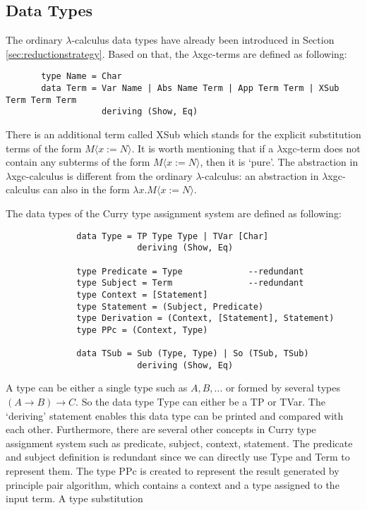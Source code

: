 \subsection{Data Types}

The ordinary $\lambda$-calculus data types have already been introduced in Section \ref{sec:reductionstrategy}. Based on that, the $\lambda$xgc-terms are defined as following: 
\begin{verbatim}
       type Name = Char  
       data Term = Var Name | Abs Name Term | App Term Term | XSub Term Term Term
                   deriving (Show, Eq)
\end{verbatim}
There is an additional term called \textsf{XSub} which stands for the explicit substitution terms of the form $M\langle x := N\rangle$. It is worth mentioning that if a $\lambda$xgc-term does not contain any subterms of the form $M\langle x := N\rangle$, then it is `pure'. The abstraction in $\lambda$xgc-calculus is different from the ordinary $\lambda$-calculus: an abstraction in $\lambda$xgc-calculus can also in the form $\lambda x.M\langle x := N\rangle$.

The data types of the Curry type assignment system are defined as following:
\begin{verbatim}
              data Type = TP Type Type | TVar [Char]
                          deriving (Show, Eq)
            
              type Predicate = Type             --redundant  
              type Subject = Term               --redundant 
              type Context = [Statement]
              type Statement = (Subject, Predicate)
              type Derivation = (Context, [Statement], Statement)
              type PPc = (Context, Type)

              data TSub = Sub (Type, Type) | So (TSub, TSub)
                          deriving (Show, Eq)
\end{verbatim}

A type can be either a single type such as $A, B,...$ or formed by several types $(A\rightarrow B)\rightarrow C$. So the data type \textsf{Type} can either be a \textsf{TP} or \textsf{TVar}. The `deriving' statement enables this data type can be printed and compared with each other. Furthermore, there are several other concepts in Curry type assignment system such as \textsf{predicate, subject, context, statement}. The \textsf{predicate} and \textsf{subject} definition is redundant since we can directly use \textsf{Type} and \textsf{Term} to represent them. The type PPc is created to represent the result generated by principle pair algorithm, which contains a context and a type assigned to the input term. A type substitution   



